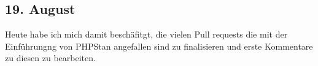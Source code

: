 \subsection{19. August}
Heute habe ich mich damit beschäfitgt, die vielen Pull requests die mit der Einführungng von PHPStan angefallen sind zu finalisieren und erste Kommentare zu diesen zu bearbeiten.